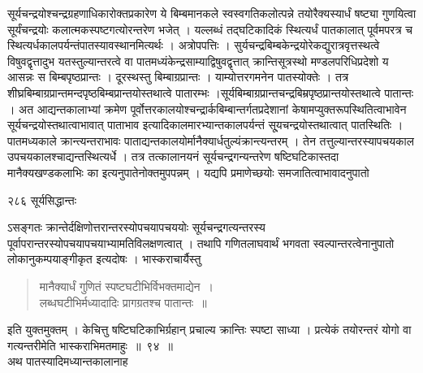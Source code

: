 \documentclass[11pt, openany]{book}
\begin{document}
 सूर्यचन्द्रयोश्चन्द्रग्रहणाधिकारोक्तप्रकारेण ये बिम्बमानकले स्वस्वगतिकलोत्पन्ने तयोरैक्यस्यार्धं षष्ट्या गुणयित्वा सूर्यंचन्द्रयोः कलात्मकस्पष्टगत्योरन्तरेण भजेत् । यल्लब्धं तद्घटिकादिकं स्थित्यर्धं पातकालात् पूर्वमपरत्र च स्थित्यर्धकालपर्यन्तंपातस्यावस्थानमित्यर्थः । अत्रोपपत्तिः । सुर्यचन्द्रबिम्बकेन्द्रयोरेकद्युरात्रवृत्तस्थत्वे विषुवद्वृत्तादुभ यतस्तुल्यान्तरत्वे वा पातमध्यंकेन्द्रसाम्याद्विषुवद्वृत्तात् क्रान्तिसूत्रस्थो मण्डलपरिधिप्रदेशो य आसन्नः स बिम्बपृष्ठप्रान्तः । दूरस्थस्तु बिम्बाग्रप्रान्तः । याम्योत्तरगमनेन पातस्योक्तेः । तत्र शीघ्रबिम्बाग्रप्रान्तमन्दपृष्ठबिम्बप्रान्तयोस्तथात्वे पातारम्भः ।सूर्यबिम्बाग्रप्रान्तचन्द्रबिम्रपृष्ठप्रान्तयोस्तथात्वे पातान्तः । अत आद्यन्तकालाभ्यां क्रमेण पूर्वोत्तरकालयोश्चन्द्रार्कबिम्बान्तर्गतप्रदेशानां केषामप्युक्तरूपस्थितित्वाभावेन सूर्यचन्द्रयोस्तथात्वाभावात् पाताभाव इत्यादिकालमारभ्यान्तकालपर्यन्तं सू्यचन्द्रयोस्तथात्वात् पातस्थितिः । पातमध्यकाले क्रान्त्यन्तराभावः  पाताद्यन्तकालयोर्मानैक्यार्धतुल्यंक्रान्त्यन्तरम् । तेन तत्तुल्यान्तरस्यापचयकाल उपचयकालश्चाद्यन्तस्थित्यर्धे । तत्र तत्कालानयनं सूर्यचन्द्रगन्यन्तरेण षष्टिघटिकास्तदा मानैक्यखण्डकलाभिः का इत्यनुपातेनोक्तमुपपन्नम् । यद्यपि प्रमाणेच्छयोः समजातित्वाभावादनुपातो \textendash



\newpage

\noindent २८६ \hspace{4cm} सूर्यसिद्धान्तः
\vspace{1cm}


\noindent ऽसङ्गतः क्रान्तेर्दक्षिणोत्तरान्तरस्योपचयापचययोः सूर्यचन्द्रगत्यन्तरस्य पूर्वापरान्तरस्योपचयापचयाभ्यामतिविलक्षणत्वात् । तथापि गणितलाघवार्थं भगवता स्वल्पान्तरत्वेनानुपातो लोकानुकम्पयाङ्गीकृत इत्यदोषः । भास्कराचार्यैस्तु\textendash


\begin{quote}
{\qt मानैक्यार्धं गुणितं स्पष्टघटीभिर्विभक्तमाद्येन~।\\
लब्धघटीभिर्मध्यादादिः प्रागग्रतश्च पातान्तः~॥}
\end{quote}

इति युक्तमुक्तम् । केचित्तु षष्टिघटिकाभिर्ग्रहान् प्रचाल्य क्रान्तिः स्पष्टा साध्या । प्रत्येकं तयोरन्तरं योगो वा गत्यन्तरीमेति भास्कराभिमतमाहुः~॥~९४~॥\\
\noindent अथ पातस्यादिमध्यान्तकालानाह \textendash

\end{document}
